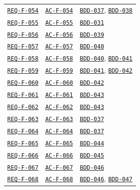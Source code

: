 \documentclass[11pt,a4paper]{article}
\begin{document}
\begin{longtable}{p{3.1cm} p{3.0cm} >{\raggedright\arraybackslash}p{9.1cm}}
\hyperlink{REQ-F-054}{\texttt{REQ-F-054}} & \hyperlink{AC-F-054}{\texttt{AC-F-054}} & \hyperlink{BDD-037}{\texttt{BDD-037}}, \hyperlink{BDD-038}{\texttt{BDD-038}} \\
\hyperlink{REQ-F-055}{\texttt{REQ-F-055}} & \hyperlink{AC-F-055}{\texttt{AC-F-055}} & \hyperlink{BDD-031}{\texttt{BDD-031}} \\
\hyperlink{REQ-F-056}{\texttt{REQ-F-056}} & \hyperlink{AC-F-056}{\texttt{AC-F-056}} & \hyperlink{BDD-039}{\texttt{BDD-039}} \\
\hyperlink{REQ-F-057}{\texttt{REQ-F-057}} & \hyperlink{AC-F-057}{\texttt{AC-F-057}} & \hyperlink{BDD-040}{\texttt{BDD-040}} \\
\hyperlink{REQ-F-058}{\texttt{REQ-F-058}} & \hyperlink{AC-F-058}{\texttt{AC-F-058}} & \hyperlink{BDD-040}{\texttt{BDD-040}}, \hyperlink{BDD-041}{\texttt{BDD-041}} \\
\hyperlink{REQ-F-059}{\texttt{REQ-F-059}} & \hyperlink{AC-F-059}{\texttt{AC-F-059}} & \hyperlink{BDD-041}{\texttt{BDD-041}}, \hyperlink{BDD-042}{\texttt{BDD-042}} \\
\hyperlink{REQ-F-060}{\texttt{REQ-F-060}} & \hyperlink{AC-F-060}{\texttt{AC-F-060}} & \hyperlink{BDD-042}{\texttt{BDD-042}} \\
\hyperlink{REQ-F-061}{\texttt{REQ-F-061}} & \hyperlink{AC-F-061}{\texttt{AC-F-061}} & \hyperlink{BDD-043}{\texttt{BDD-043}} \\
\hyperlink{REQ-F-062}{\texttt{REQ-F-062}} & \hyperlink{AC-F-062}{\texttt{AC-F-062}} & \hyperlink{BDD-043}{\texttt{BDD-043}} \\
\hyperlink{REQ-F-063}{\texttt{REQ-F-063}} & \hyperlink{AC-F-063}{\texttt{AC-F-063}} & \hyperlink{BDD-037}{\texttt{BDD-037}} \\
\hyperlink{REQ-F-064}{\texttt{REQ-F-064}} & \hyperlink{AC-F-064}{\texttt{AC-F-064}} & \hyperlink{BDD-037}{\texttt{BDD-037}} \\
\hyperlink{REQ-F-065}{\texttt{REQ-F-065}} & \hyperlink{AC-F-065}{\texttt{AC-F-065}} & \hyperlink{BDD-044}{\texttt{BDD-044}} \\
\hyperlink{REQ-F-066}{\texttt{REQ-F-066}} & \hyperlink{AC-F-066}{\texttt{AC-F-066}} & \hyperlink{BDD-045}{\texttt{BDD-045}} \\
\hyperlink{REQ-F-067}{\texttt{REQ-F-067}} & \hyperlink{AC-F-067}{\texttt{AC-F-067}} & \hyperlink{BDD-046}{\texttt{BDD-046}} \\
\hyperlink{REQ-F-068}{\texttt{REQ-F-068}} & \hyperlink{AC-F-068}{\texttt{AC-F-068}} & \hyperlink{BDD-046}{\texttt{BDD-046}}, \hyperlink{BDD-047}{\texttt{BDD-047}} \\

\end{longtable}
\end{document}
